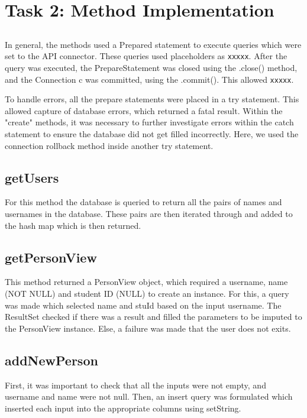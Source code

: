 \documentclass{article}
\begin{document}
\section*{Task 2: Method Implementation}

\subsection*{}

In general, the methods used a Prepared statement to execute queries which were set to the API connector. These queries used placeholders as \texttt{xxxxx}. After the query was executed, the PrepareStatement was closed using the .close() method, and the Connection c was committed, using the .commit(). This allowed \texttt{xxxxx}.

To handle errors, all the prepare statements were placed in a try statement. This allowed capture of database errors, which returned a fatal result. Within the "create" methods, it was necessary to further investigate errors within the catch statement to ensure the database did not get filled incorrectly. Here, we used the connection rollback method inside another try statement.

\subsection*{getUsers}

For this method the database is queried to return all the pairs of names and usernames in the database. These pairs are then iterated through and added to the hash map which is then returned.

\subsection*{getPersonView}

This method returned a PersonView object, which required a username, name (NOT NULL) and student ID (NULL) to create an instance. For this, a query was made which selected name and stuId based on the input username. The ResultSet checked if there was a result and filled the parameters to be imputed to the PersonView instance. Else, a failure was made that the user does not exits.

\subsection*{addNewPerson}

First, it was important to check that all the inputs were not empty, and username and name were not null. Then, an insert query was formulated which inserted each input into the appropriate columns using setString.
\end{document}
